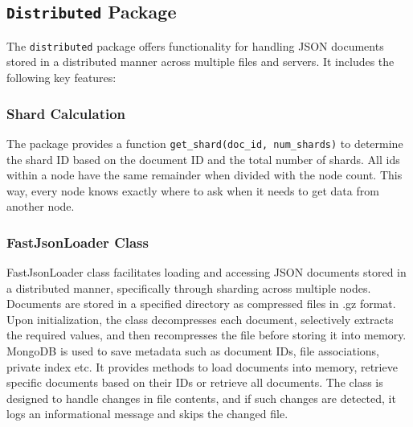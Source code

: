 \documentclass{article}
\begin{document}
\subsection{\texttt{Distributed} Package}

The \texttt{distributed} package offers functionality for handling JSON documents stored in a 
distributed manner across multiple files and servers. It includes the following key features:

\subsubsection{Shard Calculation}
The package provides a function \texttt{get\_shard(doc\_id, num\_shards)} to determine the shard 
ID based on the document ID and the total number of shards. All ids within a node have 
the same remainder when divided with the node count. This way, every node knows exactly where to 
ask when it needs to get data from another node.

\subsubsection{FastJsonLoader Class}
FastJsonLoader class facilitates loading and accessing JSON documents stored in a distributed manner,
 specifically through sharding across multiple nodes. Documents are stored in a specified directory 
 as compressed files in .gz format. Upon initialization, the class decompresses each document, 
 selectively extracts the required values, and then recompresses the file before storing it into 
 memory. MongoDB is used to save metadata such as document IDs, file associations, private index etc. 
 It provides methods to load documents into memory, retrieve specific documents based on their IDs or 
 retrieve all documents. The class is designed to handle changes in file contents, and if such changes 
 are detected, it logs an informational message and skips the changed file. 
\end{document}
